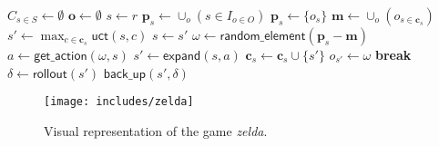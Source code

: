 \begin{algorithm}[h]
	\caption{$\mathsf{O-MCTS}(O, r, t, d)$}
	\label{alg:omcts}
	\begin{algorithmic}[1]
		\State $C_{s \in S} \gets \emptyset$ 
		\State $\mathbf{o} \gets \emptyset$ 
		 \label{alg:omcts:mainloop}
			\State $s \gets r$ 
			 \label{alg:omcts:innerloop}
				 \label{alg:omcts:sp} 
					\State $\mathbf{p}_s \gets \cup_o (s \in I_{o \in O})$ 
				\Else
					\State $\mathbf{p}_s \gets \{o_s\}$ 
				\EndIf \label{alg:omcts:ep}
				\State $\mathbf{m} \gets \cup_o (o_{s \in \mathbf{c}_s})$ 
				 
					\State $s' \gets \max_{c \in \mathbf{c}_s} \mathsf{uct}(s, c)$ \label{alg:omcts:uct} 
					\State $s \gets s'$ \label{alg:omcts:ss} 
				\Else \label{alg:omcts:sexpand}
					\State $\omega \gets \mathsf{random\_element}(\mathbf{p}_s - \mathbf{m})$ 
					\State $a \gets \mathsf{get\_action}(\omega, s)$ 
					\State $s' \gets \mathsf{expand}(s, a)$ 
						\State $\mathbf{c}_s \gets \mathbf{c}_s \cup \{s'\}$ 
					\State $o_{s'} \gets \omega$
					\State \textbf{break} \label{alg:omcts:break}
				\EndIf \label{alg:omcts:eexpand}
			\EndWhile
			\State $\delta \gets \mathsf{rollout}(s')$ \label{alg:omcts:rollout}
			\State $\mathsf{back\_up}(s', \delta)$ \label{alg:omcts:backup}
		\EndWhile
		\State {}
	\end{algorithmic}
\end{algorithm}
\begin{figure}
	\centering
	\texttt{[image: includes/zelda]}
	\caption{Visual representation of the game \textit{zelda}.}
	\label{fig:zelda}
\end{figure}

